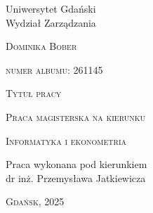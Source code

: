 \begin{titlepage}
    \begin{center}
        \LARGE		
        Uniwersytet Gdański\\Wydział Zarządzania
        
        \vspace{2cm}
        
        \textsc{Dominika Bober}
    
        \normalsize
        \textsc{numer albumu: 261145}
        
        \vspace{4cm}
        
        \huge
        
        \textsc{Tytuł pracy}		
        
        \vspace{1cm}
        
        \LARGE
        \textsc{Praca magisterska na kierunku}
        
        \Large
        \textsc{Informatyka i ekonometria}
        \vspace{5cm}
        \large
    
        \begin{flushleft}
        \hspace{7cm}
        Praca wykonana pod kierunkiem\\
        \hspace{7cm}
        dr inż. Przemysława Jatkiewicza
        \end{flushleft}
        
        \vspace{2cm}
        \normalsize
        \textsc{Gdańsk, 2025}
        \end{center}
\end{titlepage}
\restoregeometry

\singlespacing
\thispagestyle{empty}
\mbox{}
